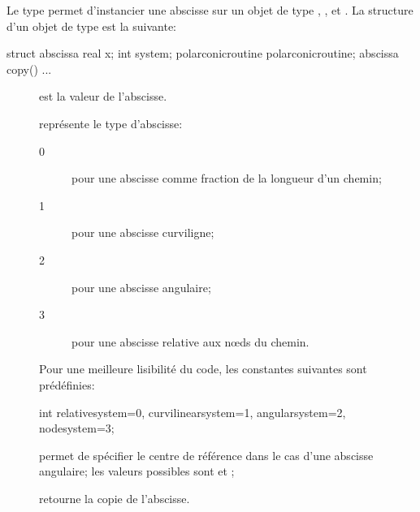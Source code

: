 \documentclass[pdftex]{article}
\begin{document}
Le type  permet d'instancier une abscisse sur un objet
de type , ,  et . La
structure d'un objet de type  est la suivante:
\begin{center}
  \begin{Vcolor}
    struct abscissa {
      real x; int system; polarconicroutine
      polarconicroutine;
      abscissa copy() {...}
    }
  \end{Vcolor}
\end{center}
\begin{description}
\item[] est la valeur de l'abscisse.
\item[] représente le type d'abscisse:
  \begin{description}
  \item[0] pour une abscisse comme fraction de la longueur d'un chemin;
  \item[1] pour une abscisse curviligne;
  \item[2] pour une abscisse angulaire;
  \item[3] pour une abscisse relative aux n\oe{}ds du chemin.
  \end{description}
  Pour une meilleure lisibilité du code, les constantes suivantes sont
  prédéfinies:
  \begin{Vcolor}
    int relativesystem=0, curvilinearsystem=1, angularsystem=2, nodesystem=3;
  \end{Vcolor}
\item[] permet de spécifier le centre de
  référence dans le cas d'une abscisse angulaire; les valeurs
  possibles sont  et ;
\item[] retourne la copie de l'abscisse.
\end{description}
\end{document}
